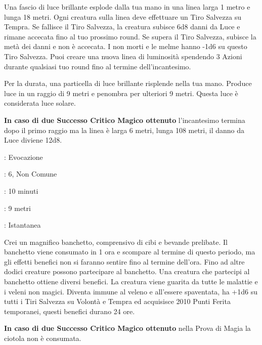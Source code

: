 \begin{multicols}{2}
Una fascio di luce brillante esplode dalla tua mano in una linea larga 1 metro e lunga 18 metri. Ogni creatura sulla linea deve effettuare un Tiro Salvezza su Tempra. Se fallisce il Tiro Salvezza, la creatura subisce 6d8 danni da Luce e rimane accecata fino al tuo prossimo round. Se supera il Tiro Salvezza, subisce la metà dei danni e non è accecata. I non morti e le melme hanno -1d6 su questo Tiro Salvezza. Puoi creare una nuova linea di luminosità spendendo 3 Azioni durante qualsiasi tuo round fino al termine dell'incantesimo.

Per la durata, una particella di luce brillante risplende nella tua mano. Produce luce in un raggio di 9 metri e penombra per ulteriori 9 metri. Questa luce è considerata luce solare.

\textbf{In caso di due Successo Critico Magico ottenuto} l'incantesimo termina dopo il primo raggio ma la linea è larga 6 metri, lunga 108 metri, il danno da Luce diviene 12d8.

\noindent\colorbox{OBSSgold!10}{
\begin{minipage}{0.95\linewidth}
\begin{description}[noitemsep, topsep=0pt, parsep=0pt, partopsep=0pt, leftmargin=0cm, labelwidth=1.3cm]
	\item[\textbf{Lista}]: Evocazione
	\item[\textbf{Livello}]: 6, Non Comune
	\item[\textbf{Lancio}]: 10 minuti
	\item[\textbf{Gittata}]: 9 metri
	\item[\textbf{Durata}]: Istantanea
\end{description}
\end{minipage}}\smallskip

Crei un magnifico banchetto, comprensivo di cibi e bevande prelibate. Il banchetto viene consumato in 1 ora e scompare al termine di questo periodo, ma gli effetti benefici non si faranno sentire fino al termine dell'ora. Fino ad altre dodici creature possono
partecipare al banchetto. Una creatura che partecipi al banchetto ottiene diversi benefici. La creatura viene guarita da tutte le malattie e i veleni non magici. Diventa immune al veleno e all'essere spaventata, ha +1d6 su tutti i Tiri Salvezza su Volontà e Tempra ed acquisisce 2010 Punti Ferita temporanei, questi benefici durano 24 ore.

\textbf{In caso di due Successo Critico Magico ottenuto} nella Prova di Magia la ciotola non è consumata.


\end{multicols}
